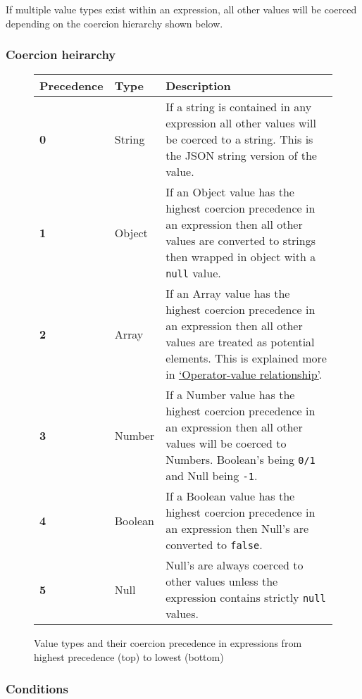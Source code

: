 \documentclass[12pt, letterpaper]{article}
\begin{document}
If multiple value types exist within an expression, all other values will be coerced depending on the coercion hierarchy shown below.

\subsubsection{Coercion heirarchy}

\begin{figure}[H]
    \begin{center}
        \begin{tabular}{| m{2cm} | m{2cm} | m{6cm} |}
            \hline
            Precedence & Type & Description\\
            \hline
            \textbf{0} & String & If a string is contained in any expression all other values will be coerced to a string. This is the JSON string version of the value.\\
            \hline
            \textbf{1} & Object & If an Object value has the highest coercion precedence in an expression then all other values are converted to strings then wrapped in object with a \verb|null| value.\\
            \hline
            \textbf{2} & Array & If an Array value has the highest coercion precedence in an expression then all other values are treated as potential elements. This is explained more in \hyperref[sec:operatorvaluerel]{`Operator-value relationship'}.\\
            \hline
            \textbf{3} & Number & If a Number value has the highest coercion precedence in an expression then all other values will be coerced to Numbers. Boolean's being \verb|0/1| and Null being \verb|-1|.\\
            \hline
            \textbf{4} & Boolean & If a Boolean value has the highest coercion precedence in an expression then Null's are converted to \verb|false|.\\
            \hline
            \textbf{5} & Null & Null's are always coerced to other values unless the expression contains strictly \verb|null| values.\\
            \hline
        \end{tabular}
    \end{center}
    \caption{Value types and their coercion precedence in expressions from highest precedence (top) to lowest (bottom)}
\end{figure}

\subsubsection{Conditions}
\end{document}
